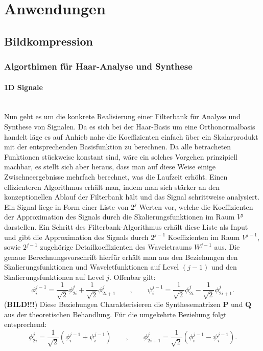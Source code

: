 \section{Anwendungen}
%
\subsection{Bildkompression}
%
\subsubsection{Algorthimen für Haar-Analyse und Synthese}
%
\paragraph{1D Signale}~\\
Nun geht es um die konkrete Realisierung einer Filterbank für Analyse und Synthese von Signalen. Da es sich bei der Haar-Basis um eine Orthonormalbasis handelt läge es auf Anhieb nahe die Koeffizienten einfach über ein Skalarprodukt mit der entsprechenden Basisfunktion zu berechnen. Da alle betracheten Funktionen stückweise konstant sind, wäre ein solches Vorgehen prinzipiell machbar, es stellt sich aber heraus, dass man auf diese Weise einige Zwischneergebnisse mehrfach berechnet, was die Laufzeit erhöht. Einen effizienteren Algorithmus erhält man, indem man sich stärker an den konzeptionellen Ablauf der Filterbank hält und das Signal schrittweise analysiert.
%
Ein Signal liege in Form einer Liste von $2^j$ Werten vor, welche die Koeffizienten der Approximation des Signals durch die Skalierungsfunktionen im Raum $V^j$ darstellen. Ein Schritt des Filterbank-Algorithmus erhält diese Liste als Input und gibt die Approximation des Signals durch $2^{j-1}$ Koeffizienten im Raum $V^{j-1}$, sowie $2^{j-1}$ zugehörige Detailkoeffizienten des Waveletraums $W^{j-1}$ aus. Die genaue Berechnungsvorschrift hierfür erhält man aus den Beziehungen den Skalierungsfunktionen und Waveletfunktionen auf Level $(j-1)$ und den Skalierungsfunktionen auf Level $j$. Offenbar gilt:
%
\[
\phi_{i}^{j-1} = \frac{1}{\sqrt{2}} \phi_{2i}^{j} + \frac{1}{\sqrt{2}} \phi_{2i+1}^{j} 
\qquad , \qquad
\psi_{i}^{j-1} = \frac{1}{\sqrt{2}} \phi_{2i}^{j} - \frac{1}{\sqrt{2}} \phi_{2i+1}^{j}
.
\]
%
(\textbf{BILD!!!}) Diese Beziehungen Charakterisieren die Synthesematrizen $\mathbf{P}$ und $\mathbf{Q}$ aus der theoretischen Behandlung. Für die umgekehrte Beziehung folgt entsprechend:
%
\[
\phi_{2i}^{j} = \frac{1}{\sqrt{2}} (\phi_{i}^{j-1} + \psi_{i}^{j-1})
\qquad , \qquad
\phi_{2i+1}^{j} = \frac{1}{\sqrt{2}} (\phi_{i}^{j-1} - \psi_{i}^{j-1})
.
\]
